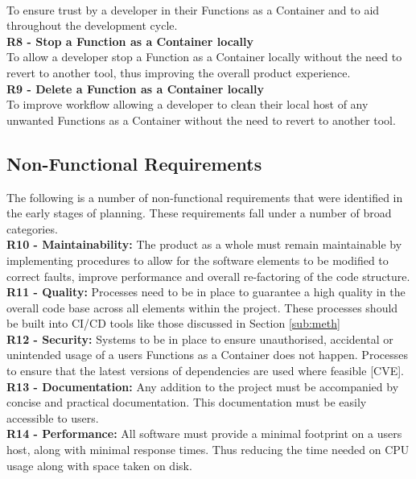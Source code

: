 \label{req:r7}
\\ To ensure trust by a developer in their Functions as a Container and to aid throughout the development cycle.
\newline
\\\textbf{R8 - Stop a Function as a Container locally}
\label{req:r8}
\\ To allow a developer stop a Function as a Container locally without the need to revert to another tool, thus improving the overall product experience.
\newline
\\\textbf{R9 - Delete a Function as a Container locally}
\label{req:r9}
\\ To improve workflow allowing a developer to clean their local host of any unwanted Functions as a Container without the need to revert to another tool.

\subsection{Non-Functional Requirements}
The following is a number of non-functional requirements that were identified in the early stages of planning. These requirements fall under a number of broad categories.
\newline
\\\textbf{R10 - Maintainability:}\label{req:r10} The product as a whole must remain maintainable by implementing procedures to allow for the software elements to be modified to correct faults, improve performance and overall re-factoring of the code structure. 
\newline
\\\textbf{R11 - Quality:}\label{req:r11} Processes need to be in place to guarantee a high quality in the overall code base across all elements within the project. These processes should be built into CI/CD tools like those discussed in Section \ref{sub:meth}
\newline
\\\textbf{R12 - Security:}\label{req:r12} Systems to be in place to ensure unauthorised, accidental or unintended usage of a users Functions as a Container does not happen. Processes to ensure that the latest versions of dependencies are used where feasible [CVE].
\newline
\\\textbf{R13 - Documentation:}\label{req:r13} Any addition to the project must be accompanied by concise and practical documentation. This documentation must be easily accessible to users.
\newline
\\\textbf{R14 - Performance:}\label{req:r14} All software must provide a minimal footprint on a users host, along with minimal response times. Thus reducing the time needed on CPU usage along with space taken on disk.
\newline


